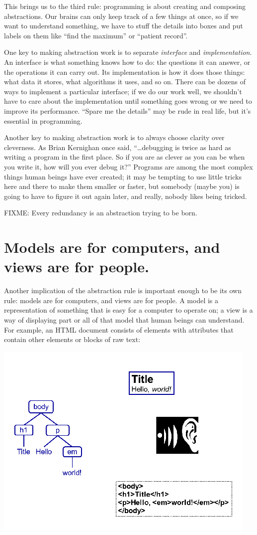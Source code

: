 \documentclass[10pt,letterpaper]{article}
\newcommand{\rulemajor}[1]{\section{#1}}
\begin{document}
This brings us to the third rule: programming is about creating and composing
abstractions.  Our brains can only keep track of a few things at once, so if we
want to understand something, we have to stuff the details into boxes and put
labels on them like ``find the maximum'' or ``patient record''.

One key to making abstraction work is to separate \emph{interface} and
\emph{implementation}.  An interface is what something knows how to do: the
questions it can answer, or the operations it can carry out. Its implementation
is how it does those things: what data it stores, what algorithms it uses, and
so on.  There can be dozens of ways to implement a particular interface; if we
do our work well, we shouldn't have to care about the implementation until
something goes wrong or we need to improve its performance.  ``Spare me the
details'' may be rude in real life, but it's essential in programming.

Another key to making abstraction work is to always choose clarity over
cleverness.  As Brian Kernighan once said, ``{\ldots}debugging is twice as hard
as writing a program in the first place.  So if you are as clever as you can be
when you write it, how will you ever debug it?''  Programs are among the most
complex things human beings have ever created; it may be tempting to use little
tricks here and there to make them smaller or faster, but somebody (maybe you)
is going to have to figure it out again later, and really, nobody likes being
tricked.

FIXME: Every redundancy is an abstraction trying to be born.

\rulemajor{Models are for computers, and views are for people.}

Another implication of the abstraction rule is important enough to be its own
rule: models are for computers, and views are for people.  A model is a
representation of something that is easy for a computer to operate on; a view is
a way of displaying part or all of that model that human beings can understand.
For example, an HTML document consists of elements with attributes that contain
other elements or blocks of raw text:

\includegraphics{modelview.png}
\end{document}
